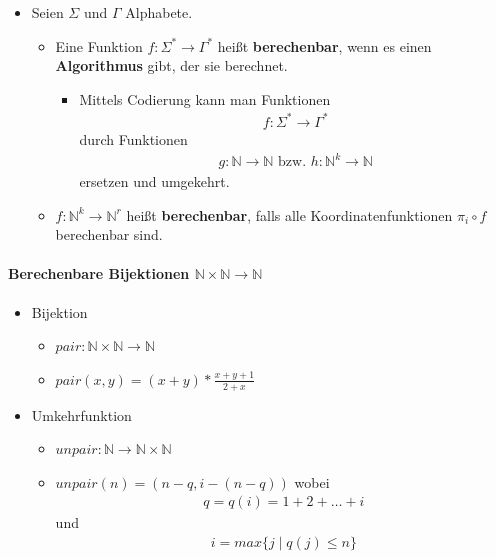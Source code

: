 \documentclass{scrartcl}
\begin{document}
\begin{itemize}
	\item Seien $\Sigma$ und $\Gamma$ Alphabete.
	\begin{itemize}
		\item Eine Funktion $f: \Sigma^* \rightarrow \Gamma^*$ heißt \textbf{berechenbar}, wenn es einen \textbf{Algorithmus} gibt, der sie berechnet.
		\begin{itemize}
			\item Mittels Codierung kann man Funktionen
			\begin{align*}
				f: \Sigma^* \rightarrow \Gamma^*
			\end{align*}
			durch Funktionen
			\begin{align*}
				g: \mathbb{N} \rightarrow \mathbb{N} \text{ bzw. } h: \mathbb{N}^k \rightarrow \mathbb{N}
			\end{align*}
			ersetzen und umgekehrt.
		\end{itemize}
		\item $f: \mathbb{N}^k \rightarrow \mathbb{N}^r$ heißt \textbf{berechenbar}, falls alle Koordinatenfunktionen $\pi_i \circ f$ berechenbar sind.
	\end{itemize}
\end{itemize}

\paragraph{Berechenbare Bijektionen $\mathbb{N} \times \mathbb{N} \rightarrow \mathbb{N}$}

\begin{itemize}
	\item Bijektion
	\begin{itemize}
		\item $pair: \mathbb{N} \times \mathbb{N} \rightarrow \mathbb{N}$
		\item $pair(x,y) = (x+y)*\frac{x+y+1}{2+x}$
	\end{itemize}
	\item Umkehrfunktion
	\begin{itemize}
		\item $unpair: \mathbb{N} \rightarrow \mathbb{N} \times \mathbb{N}$
		\item $unpair(n) = (n-q, i-(n-q))$
		wobei
		\begin{align*}
			q = q(i) = 1+2+\ldots+i
		\end{align*}
		und
		\begin{align*}
			i = max \{ j \mid q(j) \leq n \}
		\end{align*}
	\end{itemize}
\end{itemize}
\end{document}
